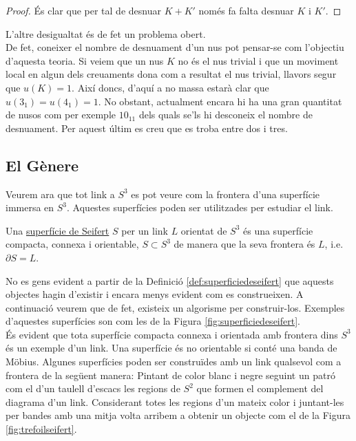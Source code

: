 \begin{proof}
	És clar que per tal de desnuar $K+K'$ només fa falta desnuar $K$ i $K'$.
\end{proof}

L'altre desigualtat és de fet un problema obert.\\

De fet, coneixer el nombre de desnuament d'un nus pot pensar-se com l'objectiu d'aquesta teoria. Si veiem que un nus $K$ no és el nus trivial i que un moviment local en algun dels creuaments dona com a resultat el nus trivial, llavors segur que $u(K)=1$. Així doncs, d'aquí a no massa estarà clar que $u(3_1)=u(4_1)=1$. No obstant, actualment encara hi ha una gran quantitat de nusos com per exemple $10_{11}$ dels quals se'ls hi desconeix el nombre de desnuament. Per aquest últim es creu que es troba entre dos i tres.\\

\subsection{El Gènere}\label{sec:generescomainvariant}

Veurem ara que tot link a $S^3$ es pot veure com la frontera d'una superfície immersa en $S^3$. Aquestes superfícies poden ser utilitzades per estudiar el link.

\begin{definition}\label{def:superficiedeseifert}
	Una \underline{superfície de Seifert} $S$ per un link $L$ orientat de $S^3$ és una superfície compacta, connexa i orientable, $S\subset S^3$ de manera que la seva frontera és $L$, i.e. $\partial S=L$.
\end{definition}

No es gens evident a partir de la Definició \ref{def:superficiedeseifert} que aquests objectes hagin d'existir i encara menys evident com es construeixen. A continuació veurem que de fet, existeix un algorisme per construir-los. Exemples d'aquestes superfícies son com les de la Figura \ref{fig:superficiedeseifert}. \\

És evident que tota superfície compacta connexa i orientada amb frontera dins $S^3$ és un exemple d'un link. Una superfície és no orientable si conté una banda de Möbius. Algunes superfícies poden ser construïdes amb un link qualsevol com a frontera de la següent manera: Pintant de color blanc i negre seguint un patró com el d'un taulell d'escacs les regions de $S^2$ que formen el complement del diagrama d'un link. Considerant totes les regions d'un mateix color i juntant-les per bandes amb una mitja volta arribem a obtenir un objecte com el de la Figura \ref{fig:trefoilseifert}.\\

